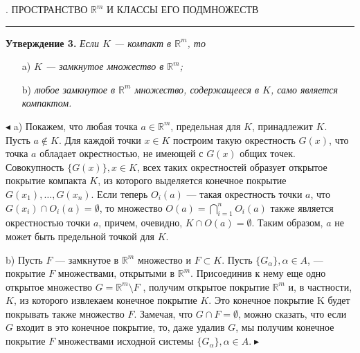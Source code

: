 \documentclass[a4paper, 12pt]{book}
\begin{document}
    \newpage

    \begin{center}
            \begin{spacing}
            
                . ПРОСТРАНСТВО $\mathbb{R}^m$ И КЛАССЫ ЕГО ПОДМНОЖЕСТВ
                \noindent\rule{\textwidth}{1pt}
            \end{spacing}
    \end{center}
    {\setlength{\parskip}{0pt}
    \par\textbf{Утверждение 3.} \textit{Если $K$ — компакт в $\mathbb{R}^m$, то}
    \begin{itemize}
        \item [a)] \textit{$K$ — замкнутое множество в $\mathbb{R}^m$;}
        \item [b)] \textit{любое замкнутое в $\mathbb{R}^m$ множество, содержащееся в $K$, само является компактом.}
    \end{itemize}}
    \par $\blacktriangleleft$ a) Покажем, что любая точка $a \in \mathbb{R}^m$, предельная для $K$, принадлежит $K$. Пусть $a \notin K$. Для каждой точки $x \in K$ построим такую окрестность $G(x)$, что точка $a$ обладает окрестностью, не имеющей с $G(x)$ общих точек. Совокупность $\{G(x)\}, x \in K$, всех таких окрестностей образует открытое покрытие компакта $K$, из которого выделяется конечное покрытие $G(x_1 ), \dots , G(x_n )$. Если теперь $O_i(a)$ — такая окрестность точки $a$, что $G(x_i) \cap O_i(a) = \emptyset$, то множество $O(a) = \bigcap\limits_{i=1}^n O_i(a)$ также является окрестностью точки $a$, причем, очевидно, $K \cap O(a) = \emptyset$. Таким образом, $a$ не может быть предельной точкой для $K$.
    {\setlength{\parskip}{0pt}
    \par b) Пусть $F$ — замкнутое в $\mathbb{R}^m$ множество и $F \subset K$. Пусть $\{G_\alpha\}, \alpha \in A$, — покрытие $F$ множествами, открытыми в $\mathbb{R}^m$. Присоединив к нему еще одно открытое множество $G = \mathbb{R}^m \setminus F$ , получим открытое покрытие $\mathbb{R}^m$ и, в частности, $K$, из которого извлекаем конечное покрытие $K$. Это конечное покрытие K будет покрывать также множество $F$. Замечая, что $G \cap F = \emptyset$, можно сказать, что если $G$ входит в это конечное покрытие, то, даже удалив $G$, мы получим конечное покрытие $F$ множествами исходной системы $\{G_\alpha\}, \alpha \in A. \blacktriangleright$}
\end{document}
